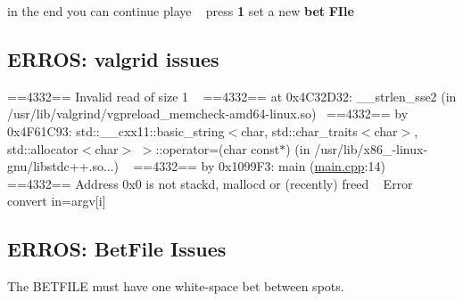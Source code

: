  in the end you can continue playe ~\newline
 press {\bfseries 1} set a new {\bfseries bet} {\bfseries F\+Ile} ~\newline
\hypertarget{index_step5}{}\subsection{E\+R\+R\+O\+S\+: valgrid issues}\label{index_step5}
==4332== Invalid read of size 1 ~\newline
==4332== at 0x4\+C32\+D32\+: \+\_\+\+\_\+strlen\+\_\+sse2 (in /usr/lib/valgrind/vgpreload\+\_\+memcheck-\/amd64-\/linux.so)~\newline
==4332== by 0x4\+F61\+C93\+: std\+::\+\_\+\+\_\+cxx11\+::basic\+\_\+string$<$char, std\+::char\+\_\+traits$<$char$>$, std\+::allocator$<$char$>$ $>$\+::operator=(char const$\ast$) (in /usr/lib/x86\+\_-\/linux-\/gnu/libstdc++.so...) ~\newline
==4332== by 0x1099\+F3\+: main (\hyperlink{main_8cpp}{main.\+cpp}\+:14)~\newline
==4332== Address 0x0 is not stack\textquotesingle{}d, malloc\textquotesingle{}d or (recently) free\textquotesingle{}d ~\newline
Error convert in=argv\mbox{[}i\mbox{]}\hypertarget{index_step6}{}\subsection{E\+R\+R\+O\+S\+: Bet\+File Issues}\label{index_step6}
The B\+E\+T\+F\+I\+LE must have one white-\/space bet between spots. 